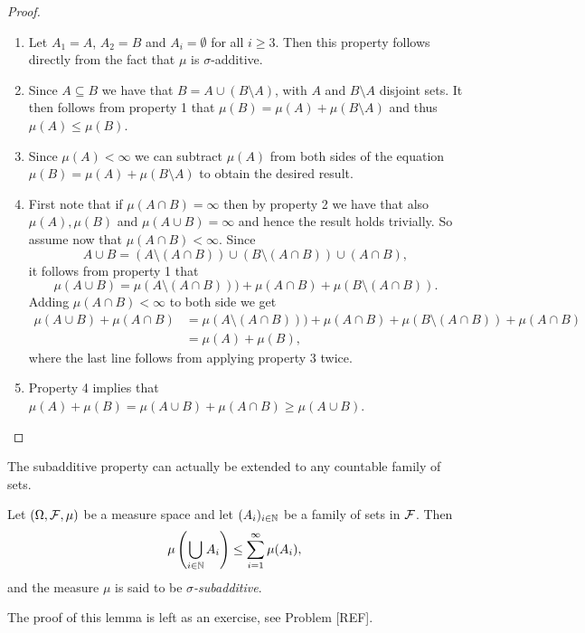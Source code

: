 \begin{proof}
\hfil
\begin{enumerate}
\item Let $A_1 = A$, $A_2 = B$ and $A_i = \emptyset$ for all $i \ge 3$. Then this property follows directly from the fact that $\mu$ is $\sigma$-additive.
\item Since $A \subseteq B$ we have that $B = A \cup (B \setminus A)$, with $A$ and $B \setminus A$ disjoint sets. It then follows from property 1 that $\mu(B) = \mu(A) + \mu(B \setminus A)$ and thus $\mu(A) \le \mu(B)$.
\item Since $\mu(A) < \infty$ we can subtract $\mu(A)$ from both sides of the equation $\mu(B) = \mu(A) + \mu(B \setminus A)$ to obtain the desired result.
\item First note that if $\mu(A \cap B) = \infty$ then by property 2 we have that also $\mu(A), \mu(B)$ and $\mu(A \cup B) = \infty$ and hence the result holds trivially. So assume now that $\mu(A \cap B) < \infty$. Since 
\[
	A \cup B = (A \setminus (A\cap B)) \cup (B \setminus (A \cap B)) \cup (A \cap B),
\] 
it follows from property 1 that
\[
	\mu(A \cup B) = \mu(A \setminus (A \cap B))) + \mu(A \cap B) + \mu(B \setminus (A \cap B)).
\] 
Adding $\mu(A \cap B) < \infty$ to both side we get
\begin{align*}
	\mu(A \cup B) + \mu(A \cap B) 
	&= \mu(A \setminus (A \cap B))) + \mu(A \cap B) + \mu(B \setminus (A \cap B)) + \mu(A \cap B)\\
	&= \mu(A) + \mu(B), 
\end{align*}
where the last line follows from applying property 3 twice.
\item Property 4 implies that $\mu(A) + \mu(B) = \mu(A \cup B) + \mu(A \cap B) \ge \mu(A \cup B)$.
\end{enumerate}
\end{proof}

The subadditive property can actually be extended to any countable family of sets.

\begin{lemma}
Let $(\Omega, \mathcal F, \mu)$ be a measure space and let $(A_i)_{i \in \mathbb N}$ be a family of sets in $\mathcal F$. Then
\[
	\mu\left(\bigcup_{i \in \mathbb N} A_i\right) \le \sum_{i = 1}^\infty \mu(A_i),
\]
and the measure $\mu$ is said to be \emph{$\sigma$-subadditive}.
\end{lemma}

The proof of this lemma is left as an exercise, see Problem [REF].

